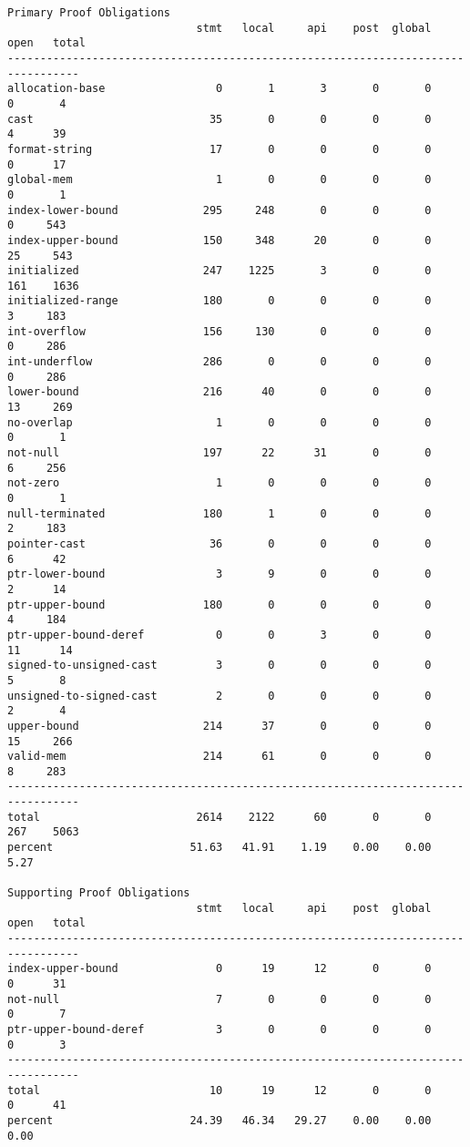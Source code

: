 \documentclass[11pt]{article}
\begin{document}
\begin{small}
\begin{verbatim}
Primary Proof Obligations
                             stmt   local     api    post  global    open   total
---------------------------------------------------------------------------------
allocation-base                 0       1       3       0       0       0       4
cast                           35       0       0       0       0       4      39
format-string                  17       0       0       0       0       0      17
global-mem                      1       0       0       0       0       0       1
index-lower-bound             295     248       0       0       0       0     543
index-upper-bound             150     348      20       0       0      25     543
initialized                   247    1225       3       0       0     161    1636
initialized-range             180       0       0       0       0       3     183
int-overflow                  156     130       0       0       0       0     286
int-underflow                 286       0       0       0       0       0     286
lower-bound                   216      40       0       0       0      13     269
no-overlap                      1       0       0       0       0       0       1
not-null                      197      22      31       0       0       6     256
not-zero                        1       0       0       0       0       0       1
null-terminated               180       1       0       0       0       2     183
pointer-cast                   36       0       0       0       0       6      42
ptr-lower-bound                 3       9       0       0       0       2      14
ptr-upper-bound               180       0       0       0       0       4     184
ptr-upper-bound-deref           0       0       3       0       0      11      14
signed-to-unsigned-cast         3       0       0       0       0       5       8
unsigned-to-signed-cast         2       0       0       0       0       2       4
upper-bound                   214      37       0       0       0      15     266
valid-mem                     214      61       0       0       0       8     283
---------------------------------------------------------------------------------
total                        2614    2122      60       0       0     267    5063
percent                     51.63   41.91    1.19    0.00    0.00    5.27

Supporting Proof Obligations
                             stmt   local     api    post  global    open   total
---------------------------------------------------------------------------------
index-upper-bound               0      19      12       0       0       0      31
not-null                        7       0       0       0       0       0       7
ptr-upper-bound-deref           3       0       0       0       0       0       3
---------------------------------------------------------------------------------
total                          10      19      12       0       0       0      41
percent                     24.39   46.34   29.27    0.00    0.00    0.00
\end{verbatim}
\end{small}
\end{document}
